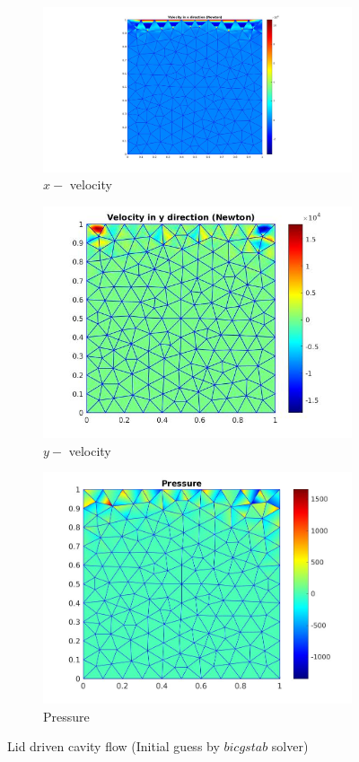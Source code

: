 \documentclass[a4paper,openany]{book}
\begin{document}
\begin{figure}
  \begin{subfigure}{\textwidth}
    \includegraphics[width=0.8\linewidth]{lid_newton_vx_bicgstab.jpg}
    \caption{$x-$ velocity}
  \label{x_vel_navier_stoke_bicgstab_lid}
  \end{subfigure}
  \begin{subfigure}{\textwidth}
    \includegraphics[width=0.8\linewidth]{lid_newton_vy_bicgstab.jpg}
    \caption{$y-$ velocity}
  \label{y_vel_navier_stoke_bicgstab_lid}
  \end{subfigure}
  \begin{subfigure}{\textwidth}
    \includegraphics[width=0.8\linewidth]{lid_newton_pressure_bicgstab.jpg}
    \caption{Pressure}
  \label{pressure_navier_stoke_bicgstab_lid}
  \end{subfigure}
\caption{Lid driven cavity flow (Initial guess by $bicgstab$ solver)}
\label{lid_driven_cavity_n_s_bicgstab}
\end{figure}
\end{document}
